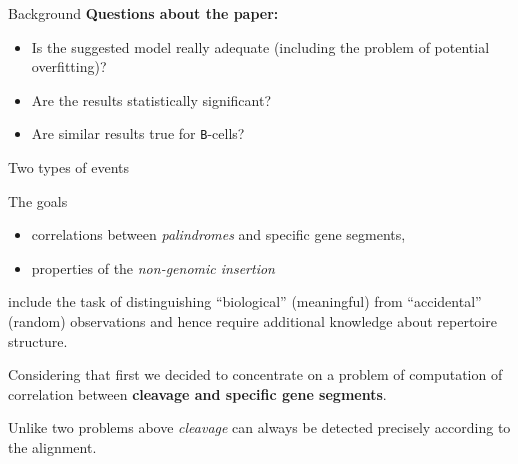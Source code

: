 \documentclass{beamer}\usepackage[]{graphicx}\usepackage[]{color}
\begin{document}
\begin{frame}{Background}
  \textbf{Questions about the paper:}
  \begin{itemize}
    \item Is the suggested model really adequate (including the problem of potential overfitting)?
    \item Are the results statistically significant?
    \item Are similar results true for \texttt{B}-cells?
  \end{itemize}
% 
\end{frame}

\begin{frame}{Two types of events}
  

  The goals 
  \begin{itemize}
    \item correlations between \textit{palindromes} and specific gene segments,
    \item properties of the \textit{non-genomic insertion}
  \end{itemize}
  include the task of distinguishing {\color{blue} ``biological''} (meaningful) from {\color{blue} ``accidental''} (random) observations and hence require additional knowledge about repertoire structure.
  
  \bigskip
  Considering that first we decided to concentrate on a problem of computation of correlation between \textbf{cleavage and specific gene segments}.
  
  \bigskip
  Unlike two problems above \textit{cleavage} can always be detected precisely according to the alignment.
\end{frame}
\end{document}
